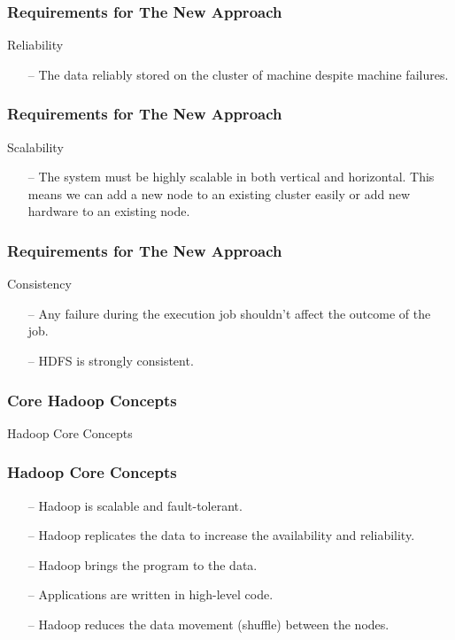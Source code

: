 \begin{frame}[c]{ }
	\frametitle{Requirements for The New Approach }
	Reliability
	\begin{itemize}  [<+->]
		\item [--] {\footnotesize The data reliably stored on the cluster of machine despite machine failures. }		
	\end{itemize}
\end{frame}
\begin{frame}[c]{ }
	\frametitle{Requirements for The New Approach }
	Scalability
	\begin{itemize}  [<+->]
		\item [--] {\footnotesize The system must be highly scalable in both vertical and horizontal. This means we can add a new node to an existing cluster easily or add new hardware to an existing node.}		
	\end{itemize}
\end{frame}
\begin{frame}[c]{ }
	\frametitle{Requirements for The New Approach }
	Consistency
	\begin{itemize}  [<+->]
		\item [--] {\footnotesize Any failure during the execution job shouldn't affect the outcome of the job.}		
		\item [--] {\footnotesize HDFS is strongly consistent.}		
	\end{itemize}
\end{frame}
\begin{frame}[c]{ }
	\frametitle{Core Hadoop Concepts }
	\centering     
	
	\textcolor{offgreen}{ \large Hadoop Core Concepts}
\end{frame}
\begin{frame}[c]{ }
	\frametitle{Hadoop Core Concepts }
	
	
	\begin{itemize}  [<+->]
		\item [--] Hadoop is scalable and fault-tolerant.
		\item [--] Hadoop replicates the data to increase the availability and reliability.
		\item [--] Hadoop brings the program to the data.
		\item [--] Applications are written in high-level code.
		\item [--] Hadoop reduces the data movement (shuffle) between the nodes.
		
	\end{itemize}
\end{frame}

